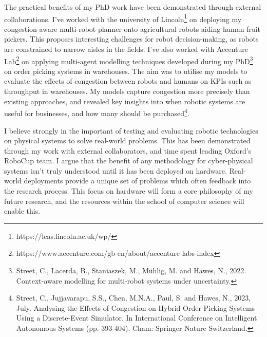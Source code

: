 \documentclass[11pt]{article}
\begin{document}
The practical benefits of my PhD work have been demonstrated through external collaborations.
%
I've worked with the university of Lincoln\footnote{https://lcas.lincoln.ac.uk/wp/} on deploying my congestion-aware multi-robot planner onto agricultural robots aiding human fruit pickers.
%
This proposes interesting challenges for robot decision-making, as robots are constrained to narrow aisles in the fields.
%
I've also worked with Accenture Lab\footnote{https://www.accenture.com/gb-en/about/accenture-labs-index} on applying multi-agent modelling techniques developed during my PhD\footnote{Street, C., Lacerda, B., Staniaszek, M., Mühlig, M. and Hawes, N., 2022. Context-aware modelling for multi-robot systems under uncertainty.} on order picking systems in warehouses.
%
The aim was to utilise my models to evaluate the effects of congestion between robots and humans on KPIs such as throughput in warehouses.
%
My models capture congestion more precisely than existing approaches, and revealed key insights into when robotic systems are useful for businesses, and how many should be purchased\footnote{Street, C., Jujjavarapu, S.S., Chen, M.N.A., Paul, S. and Hawes, N., 2023, July. Analysing the Effects of Congestion on Hybrid Order Picking Systems Using a Discrete-Event Simulator. In International Conference on Intelligent Autonomous Systems (pp. 393-404). Cham: Springer Nature Switzerland.}.



I believe strongly in the important of testing and evaluating robotic technologies on physical systems to solve real-world problems.
%
This has been demonstrated through my work with external collaborators, and time spent leading Oxford's RoboCup team.
%
I argue that the benefit of any methodology for cyber-physical systems isn't truly understood until it has been deployed on hardware.
%
Real-world deployments provide a unique set of problems which often feedback into the research process.
%
This focus on hardware will form a core philosophy of my future research, and the resources within the school of computer science will enable this.

\end{document}
